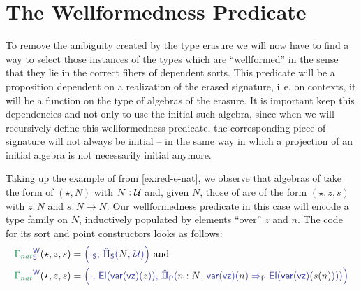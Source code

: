 \section{The Wellformedness Predicate}\label{sec:red-w}

To remove the ambiguity created by the type erasure we will now have to find
a way to select those instances of the types which are ``wellformed'' in the
sense that they lie in the correct fibers of dependent sorts.
This predicate will be a proposition dependent on a realization of the erased
signature, i.\,e. on contexts, it will be a function on the type of algebras
of the erasure.
It is important keep this dependencies and not only to use the initial such
algebra, since when we will recursively define this wellformedness predicate,
the corresponding piece of signature will not always be initial
-- in the same way in which a projection of an initial algebra is not necessarily
initial anymore.

\begin{example}\label{ex:red-w-nat}
Taking up the example of  from \ref{ex:red-e-nat},
we observe that algebras of  take the form of
$(\star, N)$ with $N : \mathcal{U}$ and, given $N$, those of
 are of the form $(\star, z, s)$ with
$z : N$ and $s : N \to N$.
Our wellformedness predicate in this case will encode a type family on $N$, inductively
populated by elements ``over'' $z$ and $n$.
The code for its sort and point constructors looks as follows:
\begin{align*}
\tqm{\grm{\Gamma_{nat}}^\WW_\Sc}(\star, z, s)
  &= \tqm{\left( \cdot_\Sc,\, \ExtPiS{N}{\UU} \right)} \text{ and} \\
\tqm{\grm{\Gamma_{nat}}^\WW}(\star, z, s)
  &= \tqm{\left( \cdot,\,  \El(\var(\vz)(\blm{z})),\,
    \ExtPiP{n : N}{\var(\vz)(\blm{n}) \Rightarrow_\Pc \El(\var(\vz)(\blm{s(n)}))} \right)}
\end{align*} %
\end{example}

